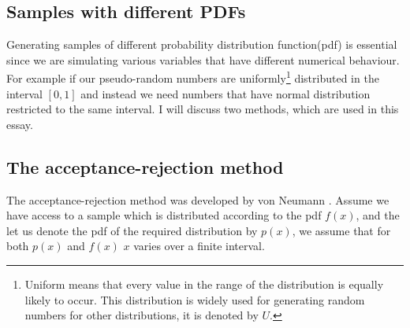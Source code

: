 \subsection{Samples with different PDFs}

Generating samples of different probability distribution function(pdf) is essential since we are simulating various variables that have different numerical behaviour. For example if our pseudo-random numbers are uniformly\footnote{Uniform means that every value in the range of the distribution is equally likely to occur. This distribution is widely used for generating random numbers for other distributions, it is denoted by $U$.} distributed in the interval $[0,1]$  and instead we need numbers that have normal distribution restricted to the same interval. I will discuss two methods, which are used in this essay.

\subsection{The acceptance-rejection method}

The acceptance-rejection method was developed by von Neumann \citep{Weinzierl}.
Assume we have access to a sample which is distributed according to the pdf $f(x)$,
and the let us denote the pdf of the required distribution by $p(x)$, we assume that for both $p(x)$ and $f(x)$ $x$ varies over a finite interval.
 
